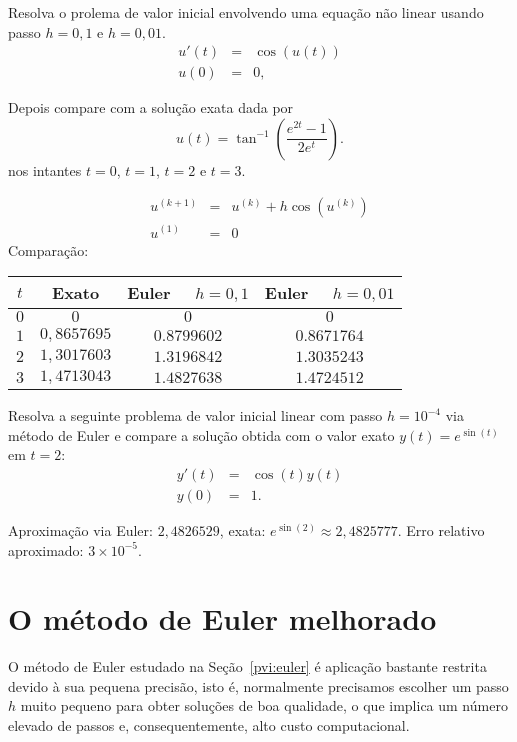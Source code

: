 \begin{exer} Resolva o prolema de valor inicial envolvendo uma equação não linear usando passo $h=0,1$ e $h=0,01$. 
 \begin{eqnarray*}
    u'(t)&=&\cos(u(t))\\
    u(0)&=&0,
  \end{eqnarray*}

Depois compare com a solução exata dada por 
$$u(t)=\tan^{-1} \left( \frac {e^{2t}-1}{{2 e^t}}
 \right).
$$
nos intantes $t=0$, $t=1$, $t=2$ e $t=3$.
\end{exer}
\begin{resp}
 \begin{eqnarray*}
  u^{(k+1)}&=&u^{(k)}+h\cos(u^{(k)})\\
  u^{(1)}&=&0
\end{eqnarray*}
Comparação:
\begin{center}
\begin{tabular}{|c|c|c|c|}\hline
$t$ &  Exato & Euler~~ $h=0,1$ & Euler~~ $h=0,01$\\\hline
$0$ &  $0$ & $0$ & $0$\\\hline
$1$ &   $0,8657695 $ & $ 0.8799602$   &   $0.8671764 $  \\\hline
$2$ &   $1,3017603 $ & $ 1.3196842 $   &  $  1.3035243$     \\\hline
$3$ &   $1,4713043 $  & $ 1.4827638 $ & $1.4724512 $   \\\hline
\end{tabular}
\end{center}
\end{resp}

\begin{exer} Resolva a seguinte problema de valor inicial linear com passo $h=10^{-4}$ via método de Euler e compare a solução obtida com o valor exato $y(t)=e^{\sin(t)}$ em $t=2$:
 \begin{eqnarray*}
    y'(t)&=&\cos(t)y(t)\\
    y(0)&=&1.
  \end{eqnarray*}
\end{exer}  
\begin{resp}
 Aproximação via Euler: $2,4826529 $, exata: $e^{\sin(2)}\approx 2,4825777 $. Erro relativo aproximado: $ 3\times 10^{-5}$.
\end{resp}

\section{O método de Euler melhorado}\label{pvi:sec_euler_mod} 
O método de Euler estudado na Seção~\ref{pvi:euler} é aplicação bastante restrita devido à sua pequena precisão, isto é, normalmente precisamos escolher um passo $h$ muito pequeno para obter soluções de boa qualidade, o que implica um número elevado de passos e, consequentemente, alto custo computacional. 

